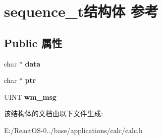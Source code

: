 \hypertarget{structsequence__t}{}\section{sequence\+\_\+t结构体 参考}
\label{structsequence__t}
\subsection*{Public 属性}
\begin{DoxyCompactItemize}
\item 
\mbox{\label{structsequence__t_a9f13466cdc51e20e49f5b8d2a871e3df}} 
char $\ast$ {\bfseries data}
\item 
\mbox{\label{structsequence__t_a9ffddbbde8d1885d1a722af404a4b5b9}} 
char $\ast$ {\bfseries ptr}
\item 
\mbox{\label{structsequence__t_aa9b26e1c6012925542971e393616a943}} 
U\+I\+NT {\bfseries wm\+\_\+msg}
\end{DoxyCompactItemize}


该结构体的文档由以下文件生成\+:\begin{DoxyCompactItemize}
\item 
E\+:/\+React\+O\+S-\/0../base/applications/calc/calc.\+h\end{DoxyCompactItemize}
